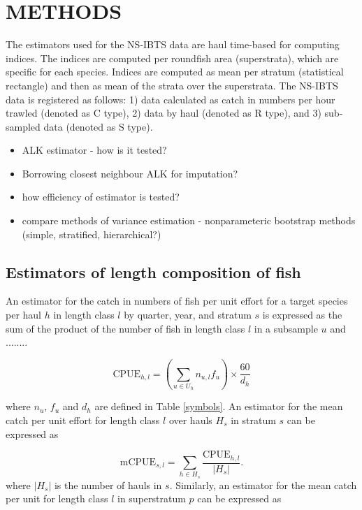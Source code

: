 \documentclass[a4paper 12pt]{article}
\numberwithin{equation}{section}
\begin{document}
\section{\large METHODS}
\label{methods}
The estimators used for the NS-IBTS data are haul time-based for computing indices. The indices are computed per roundfish area (superstrata), which are specific for each species. Indices are computed as mean per stratum (statistical rectangle) and then as mean of the strata  over the superstrata. The NS-IBTS data is registered as follows: 1) data calculated as catch in  numbers per hour trawled (denoted as C type), 2) data by haul (denoted as R type), and 3) sub-sampled data (denoted as S type). \\

\begin{itemize}
\item ALK estimator - how is it tested?
\item Borrowing closest neighbour ALK for imputation? 
\item how efficiency of estimator is tested?
\item compare methods of variance estimation - nonparameteric bootstrap methods (simple, stratified, hierarchical?)
\end{itemize}

\subsection{Estimators of length composition of fish}
An estimator for the catch in numbers of fish per unit effort for a target species   per haul $h$ in length class $l$ by quarter, year, and stratum $s$ is expressed as the sum of the product of the number of fish in length class $l$ in a subsample $u$ and ........


\begin{equation}
\mathrm{CPUE}_{h,l} = \displaystyle \left(\sum\limits_{u \in U_{h}} n_{u,l}f_{u} \right) \times \frac{60}{d_{h}}
\label{cpuelength}
\end{equation}

\noindent where $n_{u} $, $f_{u}$ and $d_{h}$ are defined in Table \ref{symbols}. An estimator for the mean catch per unit effort for length class $l$ over hauls $H_{s}$ in stratum $s$  can be expressed as 

\begin{equation}
\mathrm{mCPUE}_{s,l} = \displaystyle\sum\limits_{h \in H_{s}} \frac{\mathrm{CPUE}_{h,l}}{|H_{s}|}.
\label{mcpuelength}
\end{equation}
where $|H_{s}|$ is the number of hauls in $s$. Similarly, an estimator for the mean catch per unit for length class $l$ in superstratum $p$ can be expressed as
\end{document}
